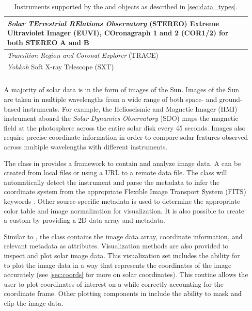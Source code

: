 \begin{table}
\begin{center}
\begin{tabular}{|p{12cm}|c|c|}
\hline
\textit{Solar TErrestrial RElations Observatory} (STEREO) Extreme Ultraviolet Imager (EUVI), COronagraph 1 and 2 (COR1/2) for both STEREO A and B & \citet{howard2008sun} \\
\hline
\textit{Transition Region and Coronal Explorer} (TRACE)  & \citet{handy99}  \\
\hline
\textit{Yohkoh} Soft X-ray Telescope (SXT) & \citet{tsuneta1991soft}  \\
\hline
\end{tabular}
\end{center}
\caption{Instruments supported by the \Timeseries and \Map objects as described in \autoref{sec:data_types}.}
\label{tab:instruments}
\end{table}

\subsubsection{\Map}
\label{sec:map}
A majority of solar data is in the form of images of the Sun.
Images of the Sun are taken in multiple wavelengths from a wide range of both space- and ground- based instruments.
For example, the Helioseismic and Magnetic Imager (HMI) instrument aboard the \textit{Solar Dynamics Observatory} (SDO) maps the magnetic field at the photosphere across the entire solar disk every 45 seconds.
Images also require precise coordinate information in order to compare solar features observed across multiple wavelengths with different instruments.

The \Map class in \sunpypkg provides a framework to contain and analyze image data.
A \Map can be created from local files or using a URL to a remote data file.
The \Map class will automatically detect the instrument and parse the metadata to infer the coordinate system from the appropriate Flexible Image Transport System (FITS) keywords \citep{refId0, 2006A&A...449..791T}.
Other source-specific metadata is used to determine the appropriate color table and image normalization for visualization.
It is also possible to create a custom \Map by providing a 2D data array and metadata.

Similar to \Timeseries, the \Map class contains the image data array, coordinate information, and relevant metadata as attributes.
Visualization methods are also provided to inspect and plot solar image data.
This visualization set includes the ability for \Map to plot the image data in a way that represents the coordinates of the image accurately (see \autoref{sec:coords} for more on solar coordinates).
This routine allows the user to plot coordinates of interest on a \Map while correctly accounting for the coordinate frame.
Other plotting components in \Map include the ability to mask and clip the image data.

